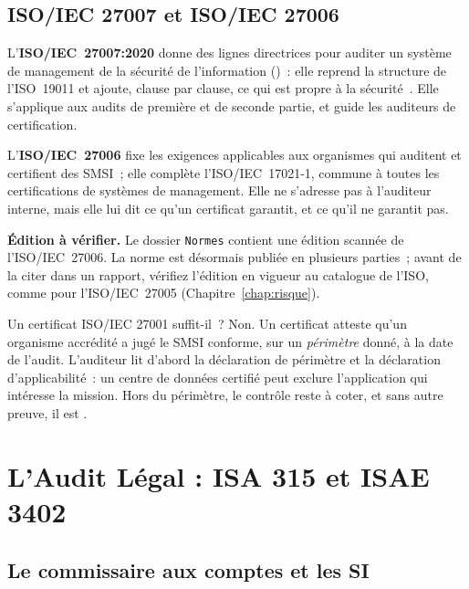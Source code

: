 \subsection{ISO/IEC 27007 et ISO/IEC 27006}

L'\textbf{ISO/IEC~27007:2020} donne des lignes directrices pour auditer un
système de management de la sécurité de l'information ()~:
elle reprend la structure de l'ISO~19011 et ajoute, clause par clause, ce
qui est propre à la sécurité~\cite{iso27007_2020}. Elle s'applique aux
audits de première et de seconde partie, et guide les auditeurs de
certification.

L'\textbf{ISO/IEC~27006} fixe les exigences applicables aux organismes qui
auditent et certifient des SMSI~; elle complète l'ISO/IEC~17021-1, commune
à toutes les certifications de systèmes de management. Elle ne s'adresse
pas à l'auditeur interne, mais elle lui dit ce qu'un certificat garantit, et
ce qu'il ne garantit pas.

\begin{boxinfo}
\textbf{Édition à vérifier.} Le dossier \texttt{Normes} contient une
édition scannée de l'ISO/IEC~27006. La norme est désormais publiée en
plusieurs parties~; avant de la citer dans un rapport, vérifiez l'édition en
vigueur au catalogue de l'ISO, comme pour l'ISO/IEC~27005
(Chapitre~\ref{chap:risque}).
\end{boxinfo}

\begin{boiteRemarque}{Un certificat ISO/IEC 27001 suffit-il~?}
Non. Un certificat atteste qu'un organisme accrédité a jugé le SMSI
conforme, sur un \emph{périmètre} donné, à la date de l'audit. L'auditeur
lit d'abord la déclaration de périmètre et la déclaration d'applicabilité~:
un centre de données certifié peut exclure l'application qui intéresse la
mission. Hors du périmètre, le contrôle reste à coter, et sans autre
preuve, il est \NEK{}.
\end{boiteRemarque}

\section{L'Audit Légal : ISA 315 et ISAE 3402}
\label{sec:c13-legal}

\subsection{Le commissaire aux comptes et les SI}


